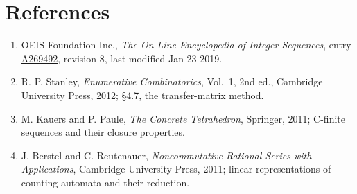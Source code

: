 \documentclass[11pt]{article}
\theoremstyle{definition}
\begin{document}
\section{References}

\begin{enumerate}

\item OEIS Foundation Inc., \emph{The On-Line Encyclopedia of Integer Sequences}, entry \href{https://oeis.org/A269492}{A269492}, revision 8, last modified Jan 23 2019.

\item R. P. Stanley, \emph{Enumerative Combinatorics}, Vol.~1, 2nd ed., Cambridge University Press, 2012; \S4.7, the transfer-matrix method.

\item M. Kauers and P. Paule, \emph{The Concrete Tetrahedron}, Springer, 2011; C-finite sequences and their closure properties.

\item J. Berstel and C. Reutenauer, \emph{Noncommutative Rational Series with Applications}, Cambridge University Press, 2011; linear representations of counting automata and their reduction.

\end{enumerate}
\end{document}
